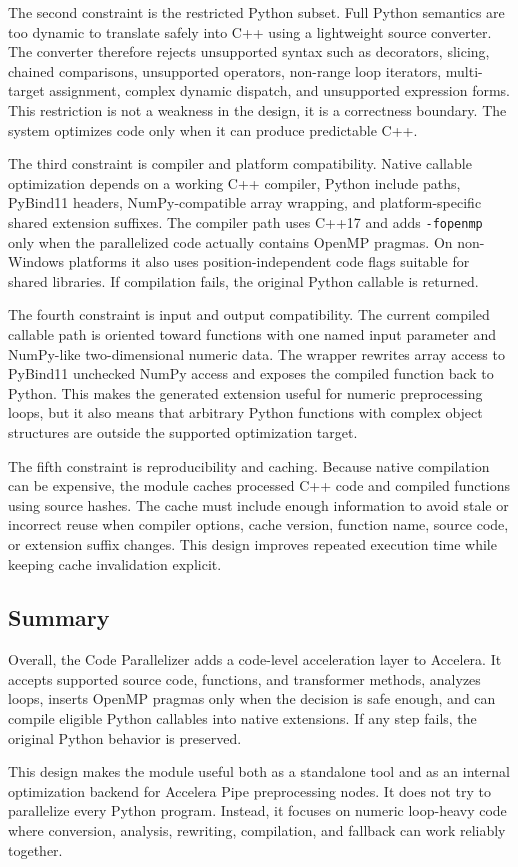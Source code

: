 The second constraint is the restricted Python subset. Full Python semantics are
too dynamic to translate safely into C++ using a lightweight source converter.
The converter therefore rejects unsupported syntax such as decorators, slicing,
chained comparisons, unsupported operators, non-range loop iterators,
multi-target assignment, complex dynamic dispatch, and unsupported expression
forms. This restriction is not a weakness in the design, it is a correctness
boundary. The system optimizes code only when it can produce predictable C++.

The third constraint is compiler and platform compatibility. Native callable
optimization depends on a working C++ compiler, Python include paths, PyBind11
headers, NumPy-compatible array wrapping, and platform-specific shared extension
suffixes. The compiler path uses C++17 and adds \texttt{-fopenmp} only when the
parallelized code actually contains OpenMP pragmas. On non-Windows platforms it
also uses position-independent code flags suitable for shared libraries. If
compilation fails, the original Python callable is returned.

The fourth constraint is input and output compatibility. The current compiled
callable path is oriented toward functions with one named input parameter and
NumPy-like two-dimensional numeric data. The wrapper rewrites array access to
PyBind11 unchecked NumPy access and exposes the compiled function back to
Python. This makes the generated extension useful for numeric preprocessing
loops, but it also means that arbitrary Python functions with complex object
structures are outside the supported optimization target.

The fifth constraint is reproducibility and caching. Because native compilation
can be expensive, the module caches processed C++ code and compiled functions
using source hashes. The cache must include enough information to avoid stale or
incorrect reuse when compiler options, cache version, function name, source code,
or extension suffix changes. This design improves repeated execution time while
keeping cache invalidation explicit.


\subsection{Summary}

Overall, the Code Parallelizer adds a code-level acceleration layer to Accelera.
It accepts supported source code, functions, and transformer methods, analyzes
loops, inserts OpenMP pragmas only when the decision is safe enough, and can
compile eligible Python callables into native extensions. If any step fails, the
original Python behavior is preserved.

This design makes the module useful both as a standalone tool and as an internal
optimization backend for Accelera Pipe preprocessing nodes. It does not try to
parallelize every Python program. Instead, it focuses on numeric loop-heavy code
where conversion, analysis, rewriting, compilation, and fallback can work
reliably together.
